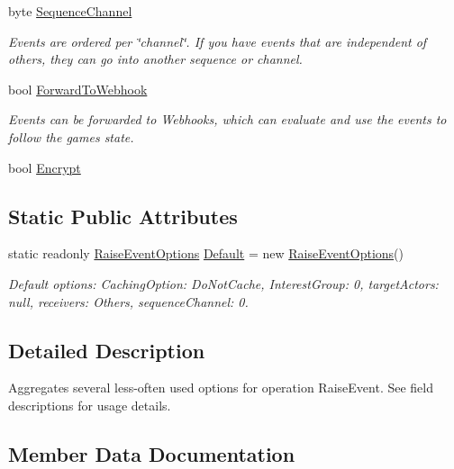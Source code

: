 \begin{DoxyCompactItemize}
byte \hyperlink{class_raise_event_options_a3fff0d28599564c9d69c147ea39682d6}{Sequence\+Channel}
\begin{DoxyCompactList}\small\item\em Events are ordered per \char`\"{}channel\char`\"{}. If you have events that are independent of others, they can go into another sequence or channel.\end{DoxyCompactList}\item 
bool \hyperlink{class_raise_event_options_a389e7e5b0df4ce93ba2731a51abc560b}{Forward\+To\+Webhook}
\begin{DoxyCompactList}\small\item\em Events can be forwarded to Webhooks, which can evaluate and use the events to follow the game\textquotesingle{}s state.\end{DoxyCompactList}\item 
bool \hyperlink{class_raise_event_options_aceba8258488a041c9b52df3bf485830c}{Encrypt}
\end{DoxyCompactItemize}
\subsection*{Static Public Attributes}
\begin{DoxyCompactItemize}
\item 
static readonly \hyperlink{class_raise_event_options}{Raise\+Event\+Options} \hyperlink{class_raise_event_options_af1fcb68ddd5f76876c8448de8b5ecb4d}{Default} = new \hyperlink{class_raise_event_options}{Raise\+Event\+Options}()
\begin{DoxyCompactList}\small\item\em Default options\+: Caching\+Option\+: Do\+Not\+Cache, Interest\+Group\+: 0, target\+Actors\+: null, receivers\+: Others, sequence\+Channel\+: 0.\end{DoxyCompactList}\end{DoxyCompactItemize}


\subsection{Detailed Description}
Aggregates several less-\/often used options for operation Raise\+Event. See field descriptions for usage details.



\subsection{Member Data Documentation}
